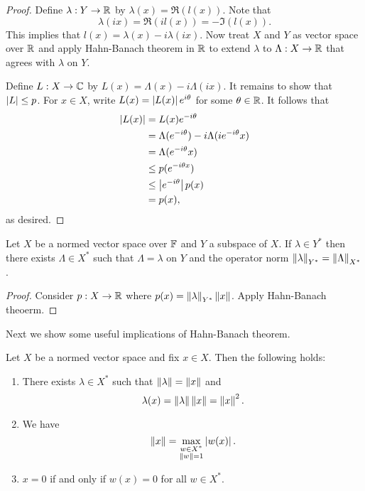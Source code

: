 \documentclass[a4paper]{article}
\begin{document}
\begin{proof}

Define $\lambda: Y \to \mathbb{R}$ by $\lambda(x) = \Re(l(x))$.
Note that 
\[
\lambda(i x) = \Re(i l(x)) = - \Im(l (x)).
\]
This implies that $l(x) = \lambda(x) - i \lambda(i x)$.
Now treat $X$ and $Y$ as vector space over $\mathbb{R}$ and apply Hahn-Banach
theorem in $\mathbb{R}$ to extend $\lambda$ to $\Lambda : X \to \mathbb{R}$
that agrees with $\lambda$ on $Y$. 

Define $L: X \to \mathbb{C}$ by $L(x) = \Lambda(x) - i \Lambda(i x)$.
It remains to show that $\left\lvert L\right\rvert \leq p$. For $x \in X$, 
write $L(x) = \left\lvert L(x)\right\rvert e^{i \theta}$ for some $\theta \in \mathbb{R}$.
It follows that 
\[
\begin{aligned}
  \left\lvert L(x)\right\rvert 
  &= L(x) e^{- i \theta} \\
  &= \Lambda(e^{- i \theta}) - i \Lambda(i e^{- i \theta} x) \\
  &= \Lambda(e^{- i \theta} x) \\
  &\leq p(e^{- i \theta x}) \\ 
  &\leq \left\lvert e^{- i \theta}\right\rvert p(x) \\
  &= p(x),
\end{aligned}
\]
as desired.

\end{proof}

\begin{thm}
Let $X$ be a normed vector space over $\mathbb{F}$ and $Y$ a subspace 
of $X$. If $\lambda \in Y^*$ then there exists 
$\Lambda \in X^*$ such that $\Lambda = \lambda$ on $Y$ and 
the operator norm 
$\left\lVert \lambda\right\rVert_{Y^*} = \left\lVert \Lambda\right\rVert_{X^*}$.
\end{thm}

\begin{proof}
  
Consider $p: X \to \mathbb{R}$ where $p(x) = \left\lVert \lambda\right\rVert_{Y^*} \left\lVert x\right\rVert$.
Apply Hahn-Banach theoerm.

\end{proof}

Next we show some useful implications of Hahn-Banach theorem.

\begin{thm}
Let $X$ be a normed vector space and fix $x \in X$. Then 
the following holds: 
\begin{enumerate}
  \item There exists $\lambda \in X^*$ such that 
  $\left\lVert \lambda\right\rVert = \left\lVert x\right\rVert$ and 
  \[
  \lambda(x) = \left\lVert \lambda\right\rVert \left\lVert x\right\rVert = \left\lVert x\right\rVert^2.
  \]
  \item We have 
  \[
  \left\lVert x\right\rVert = \max_{\substack{w \in X^* \\ \left\lVert w\right\rVert = 1}} 
  \left\lvert w(x)\right\rvert.
  \]
  \item $x = 0$ if and only if $w(x) = 0$ for all $w \in X^*$.
\end{enumerate}
\end{thm}
\end{document}
